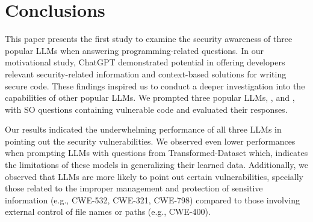 \section{Conclusions}
This paper presents the first study to examine the security awareness of three popular LLMs when answering programming-related questions.
In our motivational study, ChatGPT demonstrated potential in offering developers relevant security-related information and context-based solutions for writing secure code. 
These findings inspired us to conduct a deeper investigation into the capabilities of other popular LLMs.
We prompted three popular LLMs, \gpt, \llama and \claude, with SO questions containing vulnerable code and evaluated their responses. 

Our results indicated the underwhelming performance of all three LLMs in pointing out the security vulnerabilities. We observed even lower performances when prompting LLMs with questions from Transformed-Dataset which, indicates the limitations of these models in generalizing their learned data. 
Additionally, we observed that LLMs are more likely to point out certain vulnerabilities, specially those related to the improper management and protection of sensitive information (e.g., CWE-532, CWE-321, CWE-798) compared to those involving external control of file names or paths (e.g., CWE-400). 

